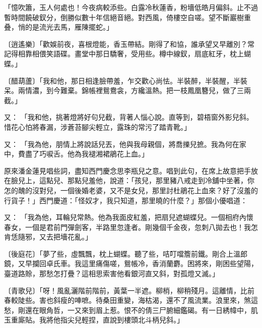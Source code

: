 \begin{showcontents}{}
「憶吹簫，玉人何處也！今夜病較添些。白露冷秋蓮香，粉墻低皓月偏斜。止不過暫時間饒破釵分，倒勝似數十年信絕音絕。對西風，倚樓空自嗟。望不斷巖樹重叠，悄的是流光去馬，雁陳擺蛇。」

〔逍遙樂〕「歡娛前夜，喜根燈能，香玉帶結。剛得了和協，誰承望又早離別？常記得相靠相偎笑語碟。畫堂中那日驕奢，受用些。樽中線釵，扇底紅牙，枕上蝴蝶。」

〔醋葫蘆〕「我和他，那日相逢臉帶羞，乍交歡心尚怯。半裝醉，半裝醒，半裝呆。兩情濃，到今難棄。錦帳裡鴛鴦衾，方纔溫熱。把一枝鳳凰簪兒，做了三兩截。」

又：  「我和他，挑著燈將好句兒截，背著人惱心說。直等到，碧梧窗外影兒斜。惜花心怕將春漏，涉蒼苔腳尖輕立，露珠的常污了踏青靴。」

又：  「我為他，朋情上將說話兒丟，他與我母親個，將喬擽兒摭。我為何在家中，費盡了巧唳舌。他為我褪湘裙鵑花上血。」

原來潘金蓮見唱些詞，盡知西門慶念思李瓶兒之意。唱到此句，在席上故意把手放在臉兒上，這點兒、那點兒羞他，說道：「孩兒，那里豬八戒走到冷舖中坐著，你怎的醜的沒對兒，一個後婚老婆，又不是女兒，那里討杜鵑花上血來？好了沒羞的行貨子！」西門慶道：「怪奴才，我只知道，那里曉的什麼？」那個小優唱道：

又：  「我為他，耳輪兒常熱。他為我面皮紅羞，把扇兒遮蝴蝶兒。一個相府內懷春女，一個是君前門彈劍客，半路里忽逢者。剛幾個千金夜，忽刺八拋去也！我怎肯恁隨邪，又去把墻花亂。」

〔後庭花〕「夢了些，虛飄飄，枕上蝴蝶。聽了些，咭叮噹簷前鐵。剛合上溫郎鏡，又早攔回卓氏車。我這里痛傷嗟，鴛帳冷，香消蘭麝。困將來，剛困些望陽，臺道路賒，那愁怎打疊？這相思索害他看銀河直又斜，對孤燈又滅。」

〔青歌兒〕「呀！風亂灑階前階前，黃葉一半遮。柳梢，柳稍殘月。這離情，比前春較陡些。害也斜瘦的唓嗻。待桑田重變，海枯渴，還不了風流業。浪里來，煞這愁，剛還在眼角哲，一又來到眉上惹。恨不的倩三尸腑細鑑碣。有一日綉幃中，肌玉重廝貼。我將他指尖兒輕捏，直說到樓頭北斗柄兒斜。」


\end{showcontents}

